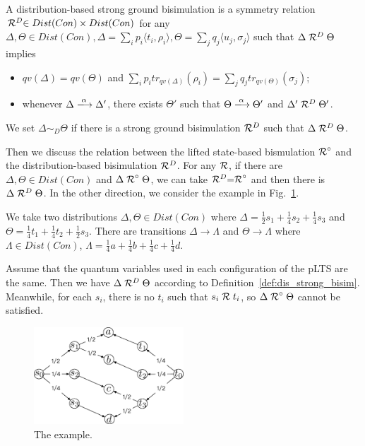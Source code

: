 \documentclass[runningheads]{llncs}
\newcommand{\lift}[1]{\mathrel{{#1}^\circ}}
\begin{document}
\begin{definition}\label{def:dis_strong_bisim}
A distribution-based strong ground bisimulation is a symmetry relation $\mathrel{{\mathcal R }}^{D}\in Dist(Con)\times Dist(Con)$ for any $\Delta,\Theta\in Dist(Con),\Delta=\sum_{i}p_{i}\langle t_{i},\rho_{i}\rangle,\Theta=\sum_{j}q_{j}\langle u_{j},\sigma_{j}\rangle$ such that $\Delta\mathrel{{\mathcal R }}^{D}\Theta$ implies
\begin{itemize}
    \item $qv(\Delta)=qv(\Theta)$ and $\sum_{i}p_{i}tr_{qv(\Delta)}(\rho_{i})=\sum_{j}q_{j}tr_{qv(\Theta)}(\sigma_{j})$;
    \item whenever $\Delta\xlongrightarrow{\alpha}\Delta'$, there exists $\Theta'$ such that $\Theta\xlongrightarrow{\alpha}\Theta'$ and $\Delta'\mathrel{{\mathcal R }}^{D}\Theta'$.
\end{itemize}
\end{definition}
We set $\Delta\sim_{D}\Theta$ if there is a strong ground bisimulation $\mathrel{{\mathcal R }}^{D}$ such that $\Delta\mathrel{{\mathcal R }}^{D}\Theta$.

Then we discuss the relation between the lifted state-based bismulation $\lift{\aRel}$ and the distribution-based bisimulation $\mathrel{{\mathcal R }}^{D}$. For any $\mathrel{{\mathcal R }}$, if there are $\Delta,\Theta\in Dist(Con)$ and $\Delta\lift{\aRel}\Theta$, we can take $\aRel^{D}=\lift{\aRel}$ and then there is $\Delta\mathrel{{\mathcal R }}^{D}\Theta$. In the other direction, we consider the example in Fig.~\ref{fig:example}.

We take two distributions $\Delta, \Theta\in Dist(Con)$ where $\Delta=\frac{1}{2}s_1+\frac{1}{4}s_2+\frac{1}{4}s_3$ and $\Theta=\frac{1}{4}t_1+\frac{1}{4}t_2+\frac{1}{2}s_3$. There are transitions $\Delta\xrightarrow{}\Lambda$ and $\Theta\xrightarrow{}\Lambda$ where $\Lambda\in Dist(Con)$,  $\Lambda=\frac{1}{4}a+\frac{1}{4}b+\frac{1}{4}c+\frac{1}{4}d$.

Assume that the quantum variables used in each configuration of the pLTS are the same. Then we have $\Delta\mathrel{{\mathcal R }}^{D} \Theta$ according to Definition~\ref{def:dis_strong_bisim}. Meanwhile, for each $s_{i}$, there is no $t_{i}$ such that $s_{i}\mathrel{{\mathcal R }} t_{i}$, so $\Delta\lift{\aRel}\Theta$ cannot be satisfied.

\begin{figure}[htbp]
    \centering
    \includegraphics[width=0.5\textwidth]{images/ex.eps}
    \caption{The example.}
    \label{fig:example}
\end{figure}
\end{document}
